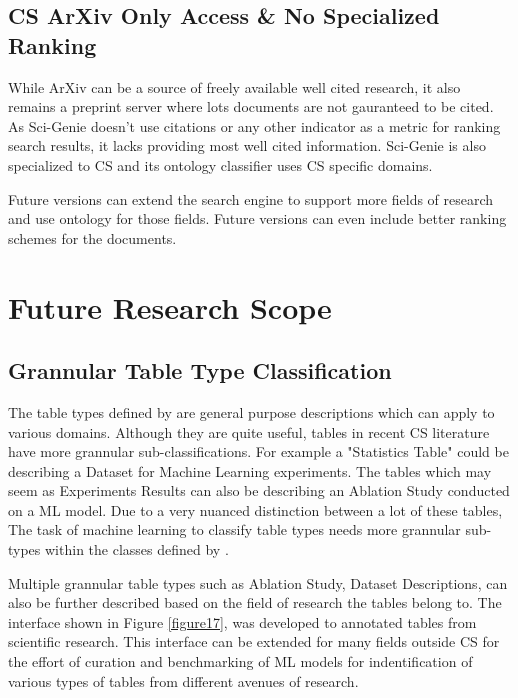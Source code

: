 \subsection{CS ArXiv Only Access \& No Specialized Ranking}
While ArXiv can be a source of freely available well cited research, it also remains a preprint server where lots documents are not gauranteed to be cited. As Sci-Genie doesn't use citations or any other indicator as a metric for ranking search results, it lacks providing most well cited information. Sci-Genie is also specialized to CS and its ontology classifier uses CS specific domains. 

Future versions can extend the search engine to support more fields of research and use ontology for those fields. Future versions can even include better ranking schemes for the documents.  

\section{Future Research Scope}
\label{conclusion:future-scope}
\subsection{Grannular Table Type Classification}
\label{conclusion:future-scope:type-class}

The table types defined by \cite{kim2012scientific} are general purpose descriptions which can apply to various domains. Although they are quite useful, tables in recent CS literature have more grannular sub-classifications. For example a "Statistics Table" could be describing a Dataset for Machine Learning experiments. The tables which may seem as Experiments Results can also be describing an Ablation Study conducted on a ML model. Due to a very nuanced distinction between a lot of these tables, The task of machine learning to classify table types needs more grannular sub-types within the classes defined by \cite{kim2012scientific}. 

Multiple grannular table types such as Ablation Study, Dataset Descriptions, can also be further described based on the field of research the tables belong to. The interface shown in Figure \ref{figure17}, was developed to annotated tables from scientific research. This interface can be extended for many fields outside CS for the effort of curation and benchmarking of ML models for indentification of various types of tables from different avenues of research. 

